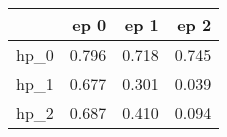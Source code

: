 \begin{tabular}{lrrr}
\toprule
{} &   ep 0 &   ep 1 &   ep 2 \\
\midrule
hp\_0 &  0.796 &  0.718 &  0.745 \\
hp\_1 &  0.677 &  0.301 &  0.039 \\
hp\_2 &  0.687 &  0.410 &  0.094 \\
\bottomrule
\end{tabular}

